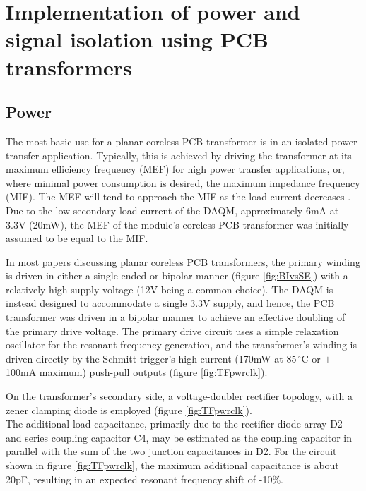 \documentclass[conference]{IEEEtran}
\begin{document}
\section{Implementation of power and signal isolation using PCB transformers}

	\subsection{Power}
	The most basic use for a planar coreless PCB transformer is in an isolated power transfer application.  Typically, this is achieved by driving the transformer at its maximum efficiency frequency (MEF) for high power transfer applications, or, where minimal power consumption is desired, the maximum impedance frequency (MIF).  The MEF will tend to approach the MIF as the load current decreases \cite{TangHuiFundamental}.  Due to the low secondary load current of the DAQM, approximately 6mA at 3.3V (20mW), the MEF of the module's coreless PCB transformer was initially assumed to be equal to the MIF.
	
	In most papers discussing planar coreless PCB transformers, the primary winding is driven in either a single-ended or bipolar manner (figure \ref{fig:BIvsSE}) with a relatively high supply voltage (12V being a common choice). The DAQM is instead designed to accommodate a single 3.3V supply, and hence, the PCB transformer was driven in a bipolar manner to achieve an effective doubling of the primary drive voltage.  The primary drive circuit uses a simple relaxation oscillator for the resonant frequency generation, and the transformer's winding is driven directly by the Schmitt-trigger's high-current (170mW at 85$ \,^{\circ} $C or $\pm$100mA maximum) push-pull outputs (figure \ref{fig:TFpwrclk}).
	
	On the transformer's secondary side, a voltage-doubler rectifier topology, with a zener clamping diode is employed (figure \ref{fig:TFpwrclk}). \\
	The additional load capacitance, primarily due to the rectifier diode array D2 and series coupling capacitor C4, may be estimated as the coupling capacitor in parallel with the sum of the two junction capacitances in D2.  For the circuit shown in figure \ref{fig:TFpwrclk}, the maximum additional capacitance is about 20pF, resulting in an expected resonant frequency shift of -10\%.
	
\end{document}
